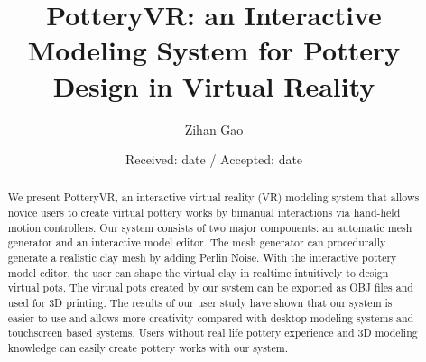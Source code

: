 \documentclass{svjour3}                     %
\begin{document}
\title{PotteryVR: an Interactive Modeling System for Pottery Design in Virtual Reality%
}


\author{Zihan Gao         %
}



\date{Received: date / Accepted: date}


\maketitle

\begin{abstract}
We present PotteryVR, an interactive virtual reality (VR) modeling system that allows novice users to create virtual pottery works by bimanual interactions via hand-held motion controllers.
Our system consists of two major components: an automatic mesh generator and an interactive model editor.
The mesh generator can procedurally generate a realistic clay mesh by adding Perlin Noise. With the interactive pottery model editor, the user can shape the virtual clay in realtime intuitively to design virtual pots.
The virtual pots created by our system can be exported as OBJ files and used for 3D printing.
The results of our user study have shown that our system is easier to use and allows more creativity compared with desktop modeling systems and touchscreen based systems. Users without real life pottery experience and 3D modeling knowledge can easily create pottery works with our system.

\end{abstract}
\end{document}
